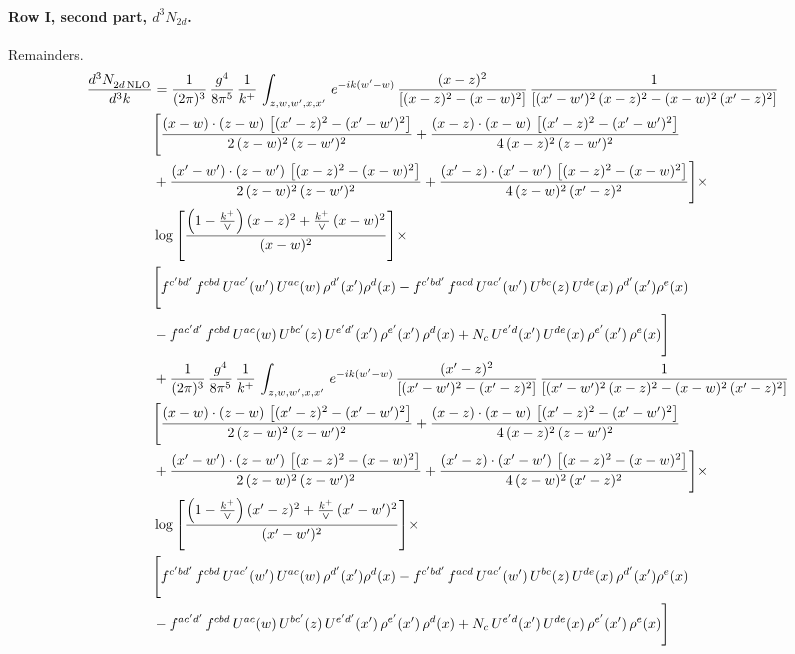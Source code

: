 \documentclass[10pt]{article}
\numberwithin{equation}{section}
\begin{document}
\paragraph{Row I, second part, $d^3N_{2d}$.}
Remainders.
\begin{align}
 \frac{d^{3}N_{2d\,\rm NLO}^{\rm}}{d^{3}k}  & =  \frac{1}{(2\pi)^{3}}\, \frac{g^{4}}{8\pi^{5}}\,\frac{1}{k^{+}}\,\int_{z,w,w^{\prime},x,x'}\, e^{-ik(w^{\prime}-w)}\,\frac{(x-z)^{2}}{\left[(x-z)^{2}-(x-w)^{2}\right]}\,\frac{1}{\left[(x'-w')^{2}\,(x-z)^{2} - (x-w)^{2}\,(x'-z)^{2}\right]}\notag \\ & \Bigg[\frac{(x-w)\cdot (z-w)\, \left[(x'-z)^{2}-(x'-w')^{2}\right]}{2\, (z-w)^{2}\, (z-w')^{2}}  + \frac{(x-z)\cdot (x-w)\,\left[(x'-z)^{2}-(x'-w')^{2}\right] }{4\,(x-z)^{2}\,(z-w')^{2}}\notag \\ & +\frac{(x'-w')\cdot (z-w')\, \left[(x-z)^{2}-(x-w)^{2}\right]}{2\, (z-w)^{2}\, (z-w')^{2}}+ \frac{(x'-z)\cdot (x'-w')\, \left[(x-z)^{2}-(x-w)^{2}\right]}{4\, (z-w)^{2}\,(x'-z)^{2}}\Bigg]\times\,\notag \\ & \log{\left[\frac{\left(1-\frac{k^{+}}{\vee}\right)(x-z)^{2}+\frac{k^{+}}{\vee}\,(x-w)^{2}}{(x-w)^{2}}\right]} \times\notag \\ & \Bigg[f^{c'bd'}\,f^{cbd}\, U^{ac'}(w')\,U^{ac}(w)\,\rho^{d'}(x')\rho^{d}(x)- f^{c'bd'}\,f^{acd}\,U^{ac'}(w')\,U^{bc}(z)\,U^{de}(x)\,\rho^{d'}(x')\rho^{e}(x) \notag \\ & -f^{ac'd'}\,f^{cbd}\,U^{ac}(w)\,U^{bc'}(z)\,U^{e'd'}(x')\,\rho^{e'}(x')\,\rho^{d}(x) +N_{c}\,U^{e'd}(x')\,U^{de}(x)\,\rho^{e'}(x')\,\rho^{e}(x)\Bigg] \notag \\
& +\frac{1}{(2\pi)^{3}}\, \frac{g^{4}}{8\pi^{5}}\,\frac{1}{k^{+}}\,\int_{z,w,w^{\prime},x,x'}\, e^{-ik(w^{\prime}-w)}\,\frac{(x'-z)^{2}}{\left[(x'-w')^{2}-(x'-z)^{2}\right]}\,\frac{1}{\left[(x'-w')^{2}\,(x-z)^{2} - (x-w)^{2}\,(x'-z)^{2}\right]}\notag \\ & \Bigg[\frac{(x-w)\cdot (z-w)\, \left[(x'-z)^{2}-(x'-w')^{2}\right]}{2\, (z-w)^{2}\, (z-w')^{2}}  + \frac{(x-z)\cdot (x-w)\,\left[(x'-z)^{2}-(x'-w')^{2}\right] }{4\,(x-z)^{2}\,(z-w')^{2}}\notag \\ & +\frac{(x'-w')\cdot (z-w')\, \left[(x-z)^{2}-(x-w)^{2}\right]}{2\, (z-w)^{2}\, (z-w')^{2}}+ \frac{(x'-z)\cdot (x'-w')\, \left[(x-z)^{2}-(x-w)^{2}\right]}{4\, (z-w)^{2}\,(x'-z)^{2}}\Bigg]\times\,\notag \\ & \log{\left[\frac{\left(1-\frac{k^{+}}{\vee}\right)(x'-z)^{2}+\frac{k^{+}}{\vee}\,(x'-w')^{2}}{(x'-w')^{2}}\right]} \times\notag \\ & \Bigg[f^{c'bd'}\,f^{cbd}\, U^{ac'}(w')\,U^{ac}(w)\,\rho^{d'}(x')\rho^{d}(x)- f^{c'bd'}\,f^{acd}\,U^{ac'}(w')\,U^{bc}(z)\,U^{de}(x)\,\rho^{d'}(x')\rho^{e}(x) \notag \\ & -f^{ac'd'}\,f^{cbd}\,U^{ac}(w)\,U^{bc'}(z)\,U^{e'd'}(x')\,\rho^{e'}(x')\,\rho^{d}(x) +N_{c}\,U^{e'd}(x')\,U^{de}(x)\,\rho^{e'}(x')\,\rho^{e}(x)\Bigg] \label{eq:R:G2I2d}
\end{align}
\end{document}
